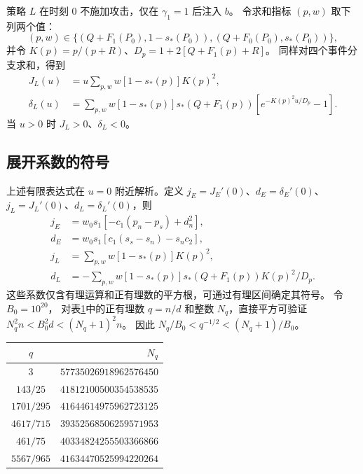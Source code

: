 策略 $L$ 在时刻 $0$ 不施加攻击，仅在 $\gamma_1=1$ 后注入 $b$。
令求和指标 $(p,w)$ 取下列两个值：
\begin{equation}
 (p,w)\in\{(Q+F_1(P_0),1-s_*(P_0)),
              (Q+F_0(P_0),s_*(P_0))\},
 \label{eq:L-branches}
\end{equation}
并令 $K(p)=p/(p+R)$、$D_p=1+2[Q+F_1(p)+R]$。
同样对四个事件分支求和，得到
\begin{align}
 J_L(u)&=u\sum_{p,w}w[1-s_*(p)]K(p)^2,\\
 \delta_L(u)&=\sum_{p,w}w[1-s_*(p)]s_*(Q+F_1(p))
                [e^{-K(p)^2u/D_p}-1].
 \label{eq:L-closed}
\end{align}
当 $u>0$ 时 $J_L>0$、$\delta_L<0$。

\subsection{展开系数的符号}
上述有限表达式在 $u=0$ 附近解析。定义
$j_E=J_E'(0)$、$d_E=\delta_E'(0)$、
$j_L=J_L'(0)$、$d_L=\delta_L'(0)$，则
\begin{align}
 j_E&=w_0s_1[-c_1(p_n-p_s)+d_n^2],\\
 d_E&=w_0s_1[c_1(s_s-s_n)-s_nc_2],\\
 j_L&=\sum_{p,w}w[1-s_*(p)]K(p)^2,\\
 d_L&=-\sum_{p,w}w[1-s_*(p)]s_*(Q+F_1(p))K(p)^2/D_p.
 \label{eq:counter-derivatives}
\end{align}
这些系数仅含有理运算和正有理数的平方根，可通过有理区间确定其符号。
令 $B_0=10^{20}$，
对表\ref{tab:sqrt-brackets}中的正有理数 $q=n/d$ 和整数 $N_q$，直接平方可验证
$N_q^2 n<B_0^2d<(N_q+1)^2 n$。
因此 $N_q/B_0<q^{-1/2}<(N_q+1)/B_0$。
\begin{table}[H]
\centering\small
{}
\label{tab:sqrt-brackets}
\begin{tabular}{cr}
\toprule
$q$ & $N_q$\\
\midrule
$3$ & $57735026918962576450$\\
$143/25$ & $41812100500354538535$\\
$1701/295$ & $41644614975962723125$\\
$4617/715$ & $39352568506259571953$\\
$461/75$ & $40334824255503366866$\\
$5567/965$ & $41634470525994220264$\\
\bottomrule
\end{tabular}
\end{table}
